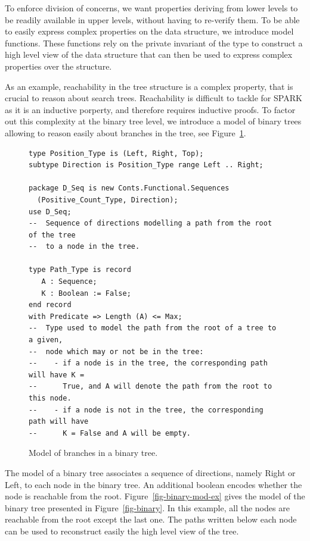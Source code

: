 \documentclass[11pt,a4paper]{article}
\newcommand{\spark}{SPARK\xspace}
\begin{document}
To enforce division of concerns, we want properties deriving from lower levels to
be readily available in upper levels, without having to re-verify them. To be
able to easily express complex properties on the data structure, we
introduce model functions. These functions rely on the private invariant of the type
to construct a high level view of the data structure that can then be used to express
complex properties over the structure.

As an example, reachability in the tree structure is a complex property, that is
crucial to reason about search trees. Reachability is difficult to tackle for \spark
as it is an inductive porperty, and therefore requires inductive proofs. To factor out
this complexity at the binary tree level, we introduce
a model of binary trees allowing to reason easily about branches in the tree, see
Figure~\ref{fig-binary-mod}.

\begin{figure}[ht]
\begin{small}
\begin{lstlisting}
type Position_Type is (Left, Right, Top);
subtype Direction is Position_Type range Left .. Right;

package D_Seq is new Conts.Functional.Sequences
  (Positive_Count_Type, Direction);
use D_Seq;
--  Sequence of directions modelling a path from the root of the tree
--  to a node in the tree.

type Path_Type is record
   A : Sequence;
   K : Boolean := False;
end record
with Predicate => Length (A) <= Max;
--  Type used to model the path from the root of a tree to a given,
--  node which may or not be in the tree:
--    - if a node is in the tree, the corresponding path will have K =
--      True, and A will denote the path from the root to this node.
--    - if a node is not in the tree, the corresponding path will have
--      K = False and A will be empty.
\end{lstlisting}
\end{small}
\caption{\label{fig-binary-mod} Model of branches in a binary tree.}
\end{figure}

The model of a binary tree associates a sequence of directions, namely
Right or Left, to each node in the binary tree. An additional boolean encodes
whether the node is reachable from the root. Figure~\ref{fig-binary-mod-ex} gives
the model of the binary tree presented in Figure~\ref{fig-binary}. In this
example, all the nodes are reachable from the root except the last one. The
paths written below each node can be used to reconstruct easily the high level
view of the tree.
\end{document}
